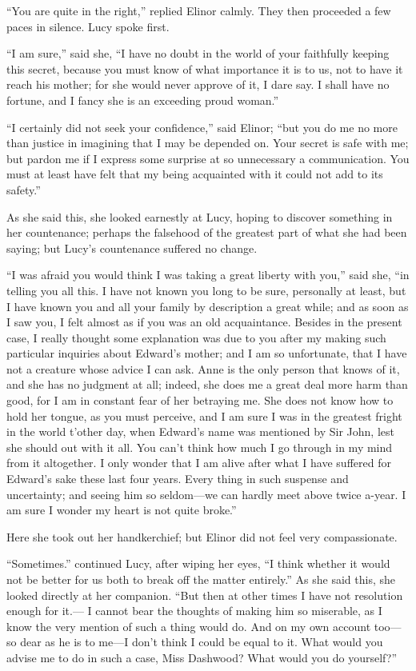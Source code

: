 \documentclass{article}
\begin{document}
``You are quite in the right,'' replied Elinor calmly.
They then proceeded a few paces in silence.  Lucy spoke first.

``I am sure,'' said she, ``I have no doubt in the world
of your faithfully keeping this secret, because you must
know of what importance it is to us, not to have it reach
his mother; for she would never approve of it, I dare say.
I shall have no fortune, and I fancy she is an exceeding
proud woman.''

``I certainly did not seek your confidence,'' said Elinor;
``but you do me no more than justice in imagining that I
may be depended on.  Your secret is safe with me;
but pardon me if I express some surprise at so unnecessary
a communication.  You must at least have felt that my
being acquainted with it could not add to its safety.''

As she said this, she looked earnestly at Lucy,
hoping to discover something in her countenance; perhaps the
falsehood of the greatest part of what she had been saying;
but Lucy's countenance suffered no change.

``I was afraid you would think I was taking a great
liberty with you,'' said she, ``in telling you all this.
I have not known you long to be sure, personally at least,
but I have known you and all your family by description
a great while; and as soon as I saw you, I felt almost as if
you was an old acquaintance.  Besides in the present case,
I really thought some explanation was due to you after my
making such particular inquiries about Edward's mother;
and I am so unfortunate, that I have not a creature whose
advice I can ask.  Anne is the only person that knows of it,
and she has no judgment at all; indeed, she does me a great
deal more harm than good, for I am in constant fear of her
betraying me.  She does not know how to hold her tongue,
as you must perceive, and I am sure I was in the greatest
fright in the world t'other day, when Edward's name was
mentioned by Sir John, lest she should out with it all.
You can't think how much I go through in my mind from
it altogether.  I only wonder that I am alive after what
I have suffered for Edward's sake these last four years.
Every thing in such suspense and uncertainty; and seeing
him so seldom---we can hardly meet above twice a-year.
I am sure I wonder my heart is not quite broke.''

Here she took out her handkerchief; but Elinor did
not feel very compassionate.

``Sometimes.'' continued Lucy, after wiping her eyes,
``I think whether it would not be better for us both
to break off the matter entirely.''  As she said this,
she looked directly at her companion.  ``But then
at other times I have not resolution enough for it.---%
I cannot bear the thoughts of making him so miserable,
as I know the very mention of such a thing would do.
And on my own account too---so dear as he is to me---I don't
think I could be equal to it.  What would you advise
me to do in such a case, Miss Dashwood?  What would you
do yourself?''
\end{document}
